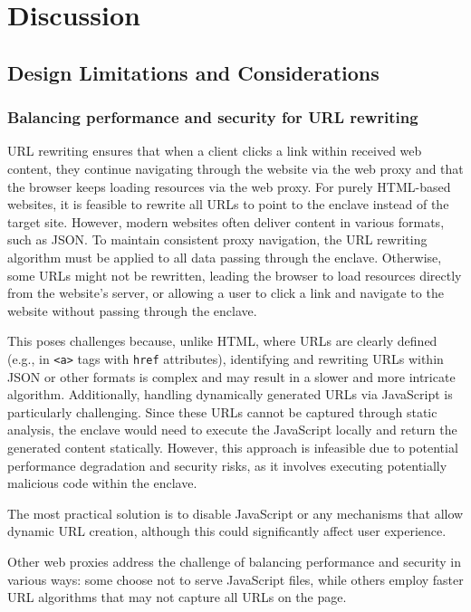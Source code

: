 \chapter{Discussion}\label{ch:sample-chapter}
\section{Design Limitations and Considerations}

\subsection{Balancing performance and security for URL rewriting} \label{sec:url-rewriting-limitations}
URL rewriting ensures that when a client clicks a link within received web content, they continue navigating through the website via the web proxy and that the browser keeps loading resources via the web proxy. For purely HTML-based websites, it is feasible to rewrite all URLs to point to the enclave instead of the target site. However, modern websites often deliver content in various formats, such as JSON. To maintain consistent proxy navigation, the URL rewriting algorithm must be applied to all data passing through the enclave. Otherwise, some URLs might not be rewritten, leading the browser to load resources directly from the website's server, or allowing a user to click a link and navigate to the website without passing through the enclave.

This poses challenges because, unlike HTML, where URLs are clearly defined (e.g., in \texttt{<a>} tags with \texttt{href} attributes), identifying and rewriting URLs within JSON or other formats is complex and may result in a slower and more intricate algorithm. Additionally, handling dynamically generated URLs via JavaScript is particularly challenging. Since these URLs cannot be captured through static analysis, the enclave would need to execute the JavaScript locally and return the generated content statically. However, this approach is infeasible due to potential performance degradation and security risks, as it involves executing potentially malicious code within the enclave.

The most practical solution is to disable JavaScript or any mechanisms that allow dynamic URL creation, although this could significantly affect user experience.

Other web proxies address the challenge of balancing performance and security in various ways: some choose not to serve JavaScript files, while others employ faster URL algorithms that may not capture all URLs on the page.

